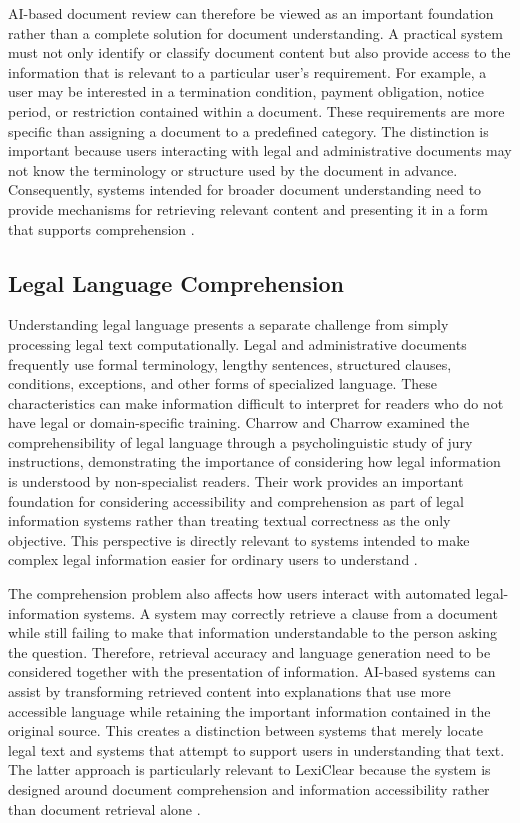 \documentclass[12pt,a4paper,oneside]{report}
\begin{document}
AI-based document review can therefore be viewed as an important foundation
rather than a complete solution for document understanding. A practical system
must not only identify or classify document content but also provide access to
the information that is relevant to a particular user's requirement. For
example, a user may be interested in a termination condition, payment
obligation, notice period, or restriction contained within a document. These
requirements are more specific than assigning a document to a predefined
category. The distinction is important because users interacting with legal
and administrative documents may not know the terminology or structure used
by the document in advance. Consequently, systems intended for broader
document understanding need to provide mechanisms for retrieving relevant
content and presenting it in a form that supports comprehension
\cite{mahoney2019,nethriya2024}.

\subsection{Legal Language Comprehension}

Understanding legal language presents a separate challenge from simply
processing legal text computationally. Legal and administrative documents
frequently use formal terminology, lengthy sentences, structured clauses,
conditions, exceptions, and other forms of specialized language. These
characteristics can make information difficult to interpret for readers who
do not have legal or domain-specific training. Charrow and Charrow examined
the comprehensibility of legal language through a psycholinguistic study of
jury instructions, demonstrating the importance of considering how legal
information is understood by non-specialist readers. Their work provides an
important foundation for considering accessibility and comprehension as part
of legal information systems rather than treating textual correctness as the
only objective. This perspective is directly relevant to systems intended to
make complex legal information easier for ordinary users to understand
\cite{charrow1979}.

The comprehension problem also affects how users interact with automated
legal-information systems. A system may correctly retrieve a clause from a
document while still failing to make that information understandable to the
person asking the question. Therefore, retrieval accuracy and language
generation need to be considered together with the presentation of information.
AI-based systems can assist by transforming retrieved content into explanations
that use more accessible language while retaining the important information
contained in the original source. This creates a distinction between systems
that merely locate legal text and systems that attempt to support users in
understanding that text. The latter approach is particularly relevant to
LexiClear because the system is designed around document comprehension and
information accessibility rather than document retrieval alone
\cite{charrow1979,basha2024}.
\end{document}
